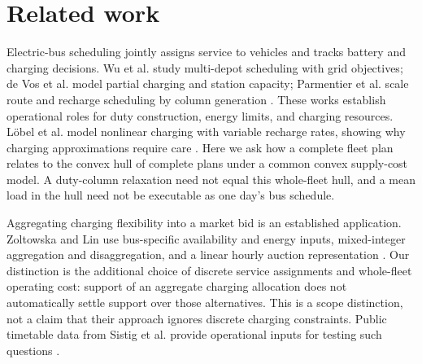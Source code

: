 \section{Related work}

Electric-bus scheduling jointly assigns service to vehicles and tracks battery and charging decisions. Wu et al. study multi-depot scheduling with grid objectives; de Vos et al. model partial charging and station capacity; Parmentier et al. scale route and recharge scheduling by column generation \citep{wu2022grid,devos2024capacity,parmentier2023fleets}. These works establish operational roles for duty construction, energy limits, and charging resources. L\"obel et al. model nonlinear charging with variable recharge rates, showing why charging approximations require care \citep{lobel2024charging}. Here we ask how a complete fleet plan relates to the convex hull of complete plans under a common convex supply-cost model. A duty-column relaxation need not equal this whole-fleet hull, and a mean load in the hull need not be executable as one day's bus schedule.

Aggregating charging flexibility into a market bid is an established application. Zoltowska and Lin use bus-specific availability and energy inputs, mixed-integer aggregation and disaggregation, and a linear hourly auction representation \citep{zoltowskaLin2021}. Our distinction is the additional choice of discrete service assignments and whole-fleet operating cost: support of an aggregate charging allocation does not automatically settle support over those alternatives. This is a scope distinction, not a claim that their approach ignores discrete charging constraints. Public timetable data from Sistig et al. provide operational inputs for testing such questions \citep{sistig2025dataset,sistig2025electrification}.

